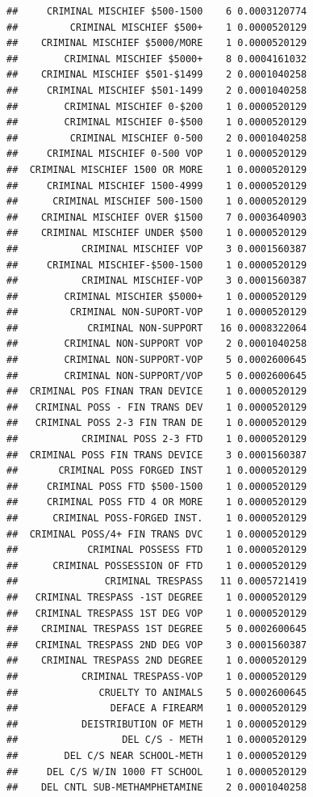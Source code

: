 \documentclass[]{book}
\begin{document}
\begin{verbatim}
##     CRIMINAL MISCHIEF $500-1500    6 0.0003120774
##         CRIMINAL MISCHIEF $500+    1 0.0000520129
##    CRIMINAL MISCHIEF $5000/MORE    1 0.0000520129
##        CRIMINAL MISCHIEF $5000+    8 0.0004161032
##    CRIMINAL MISCHIEF $501-$1499    2 0.0001040258
##     CRIMINAL MISCHIEF $501-1499    2 0.0001040258
##        CRIMINAL MISCHIEF 0-$200    1 0.0000520129
##        CRIMINAL MISCHIEF 0-$500    1 0.0000520129
##         CRIMINAL MISCHIEF 0-500    2 0.0001040258
##     CRIMINAL MISCHIEF 0-500 VOP    1 0.0000520129
##  CRIMINAL MISCHIEF 1500 OR MORE    1 0.0000520129
##     CRIMINAL MISCHIEF 1500-4999    1 0.0000520129
##      CRIMINAL MISCHIEF 500-1500    1 0.0000520129
##    CRIMINAL MISCHIEF OVER $1500    7 0.0003640903
##    CRIMINAL MISCHIEF UNDER $500    1 0.0000520129
##           CRIMINAL MISCHIEF VOP    3 0.0001560387
##     CRIMINAL MISCHIEF-$500-1500    1 0.0000520129
##           CRIMINAL MISCHIEF-VOP    3 0.0001560387
##        CRIMINAL MISCHIER $5000+    1 0.0000520129
##         CRIMINAL NON-SUPORT-VOP    1 0.0000520129
##            CRIMINAL NON-SUPPORT   16 0.0008322064
##        CRIMINAL NON-SUPPORT VOP    2 0.0001040258
##        CRIMINAL NON-SUPPORT-VOP    5 0.0002600645
##        CRIMINAL NON-SUPPORT/VOP    5 0.0002600645
##  CRIMINAL POS FINAN TRAN DEVICE    1 0.0000520129
##   CRIMINAL POSS - FIN TRANS DEV    1 0.0000520129
##   CRIMINAL POSS 2-3 FIN TRAN DE    1 0.0000520129
##           CRIMINAL POSS 2-3 FTD    1 0.0000520129
##  CRIMINAL POSS FIN TRANS DEVICE    3 0.0001560387
##       CRIMINAL POSS FORGED INST    1 0.0000520129
##     CRIMINAL POSS FTD $500-1500    1 0.0000520129
##     CRIMINAL POSS FTD 4 OR MORE    1 0.0000520129
##      CRIMINAL POSS-FORGED INST.    1 0.0000520129
##  CRIMINAL POSS/4+ FIN TRANS DVC    1 0.0000520129
##            CRIMINAL POSSESS FTD    1 0.0000520129
##      CRIMINAL POSSESSION OF FTD    1 0.0000520129
##               CRIMINAL TRESPASS   11 0.0005721419
##   CRIMINAL TRESPASS -1ST DEGREE    1 0.0000520129
##   CRIMINAL TRESPASS 1ST DEG VOP    1 0.0000520129
##    CRIMINAL TRESPASS 1ST DEGREE    5 0.0002600645
##   CRIMINAL TRESPASS 2ND DEG VOP    3 0.0001560387
##    CRIMINAL TRESPASS 2ND DEGREE    1 0.0000520129
##           CRIMINAL TRESPASS-VOP    1 0.0000520129
##              CRUELTY TO ANIMALS    5 0.0002600645
##                DEFACE A FIREARM    1 0.0000520129
##           DEISTRIBUTION OF METH    1 0.0000520129
##                  DEL C/S - METH    1 0.0000520129
##        DEL C/S NEAR SCHOOL-METH    1 0.0000520129
##     DEL C/S W/IN 1000 FT SCHOOL    1 0.0000520129
##    DEL CNTL SUB-METHAMPHETAMINE    2 0.0001040258

\end{verbatim}
\end{document}
